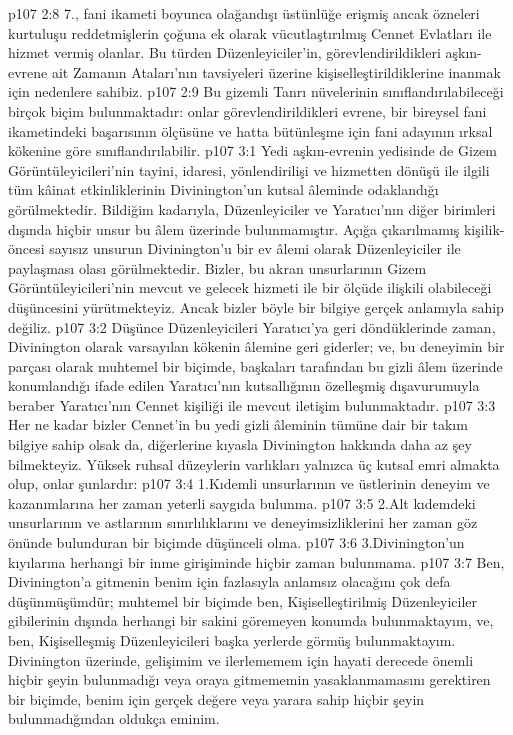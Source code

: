 \vs p107 2:8 7.\bibnobreakspace {}, fani ikameti boyunca olağandışı üstünlüğe erişmiş ancak özneleri kurtuluşu reddetmişlerin çoğuna ek olarak vücutlaştırılmış Cennet Evlatları ile hizmet vermiş olanlar. Bu türden Düzenleyiciler’in, görevlendirildikleri aşkın\hyp{}evrene ait Zamanın Ataları’nın tavsiyeleri üzerine kişiselleştirildiklerine inanmak için nedenlere sahibiz.
\vs p107 2:9 Bu gizemli Tanrı nüvelerinin sınıflandırılabileceği birçok biçim bulunmaktadır: onlar görevlendirildikleri evrene, bir bireysel fani ikametindeki başarısının ölçüsüne ve hatta bütünleşme için fani adayının ırksal kökenine göre sınıflandırılabilir.
\vs p107 3:1 Yedi aşkın\hyp{}evrenin yedisinde de Gizem Görüntüleyicileri’nin tayini, idaresi, yönlendirilişi ve hizmetten dönüşü ile ilgili tüm kâinat etkinliklerinin Divinington’un kutsal âleminde odaklandığı görülmektedir. Bildiğim kadarıyla, Düzenleyiciler ve Yaratıcı’nın diğer birimleri dışında hiçbir unsur bu âlem üzerinde bulunmamıştır. Açığa çıkarılmamış kişilik\hyp{}öncesi sayısız unsurun Divinington’u bir ev âlemi olarak Düzenleyiciler ile paylaşması olası görülmektedir. Bizler, bu akran unsurlarının Gizem Görüntüleyicileri’nin mevcut ve gelecek hizmeti ile bir ölçüde ilişkili olabileceği düşüncesini yürütmekteyiz. Ancak bizler böyle bir bilgiye gerçek anlamıyla sahip değiliz.
\vs p107 3:2 Düşünce Düzenleyicileri Yaratıcı’ya geri döndüklerinde zaman, Divinington olarak varsayılan kökenin âlemine geri giderler; ve, bu deneyimin bir parçası olarak muhtemel bir biçimde, başkaları tarafından bu gizli âlem üzerinde konumlandığı ifade edilen Yaratıcı’nın kutsallığının özelleşmiş dışavurumuyla beraber Yaratıcı’nın Cennet kişiliği ile mevcut iletişim bulunmaktadır.
\vs p107 3:3 Her ne kadar bizler Cennet’in bu yedi gizli âleminin tümüne dair bir takım bilgiye sahip olsak da, diğerlerine kıyasla Divinington hakkında daha az şey bilmekteyiz. Yüksek ruhsal düzeylerin varlıkları yalnızca üç kutsal emri almakta olup, onlar şunlardır:
\vs p107 3:4 1.\bibnobreakspace Kıdemli unsurlarının ve üstlerinin deneyim ve kazanımlarına her zaman yeterli saygıda bulunma.
\vs p107 3:5 2.\bibnobreakspace Alt kıdemdeki unsurlarının ve astlarının sınırlılıklarını ve deneyimsizliklerini her zaman göz önünde bulunduran bir biçimde düşünceli olma.
\vs p107 3:6 3.\bibnobreakspace Divinington’un kıyılarına herhangi bir inme girişiminde hiçbir zaman bulunmama.
\vs p107 3:7 Ben, Divinington’a gitmenin benim için fazlasıyla anlamsız olacağını çok defa düşünmüşümdür; muhtemel bir biçimde ben, Kişiselleştirilmiş Düzenleyiciler gibilerinin dışında herhangi bir sakini göremeyen konumda bulunmaktayım, ve, ben, Kişiselleşmiş Düzenleyicileri başka yerlerde görmüş bulunmaktayım. Divinington üzerinde, gelişimim ve ilerlememem için hayati derecede önemli hiçbir şeyin bulunmadığı veya oraya gitmememin yasaklanmamasını gerektiren bir biçimde, benim için gerçek değere veya yarara sahip hiçbir şeyin bulunmadığından oldukça eminim.
